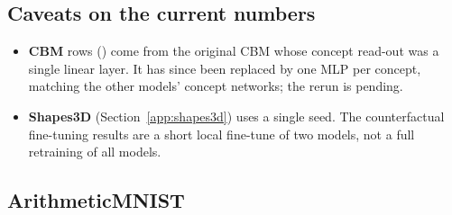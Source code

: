 \subsection{Caveats on the current numbers}
\label{app:caveats}
\begin{itemize}
  \item \textbf{CBM} rows (\ddag) come from the original CBM whose concept
        read-out was a single linear layer. It has since been replaced by one
        MLP per concept, matching the other models' concept networks; the
        rerun is pending. 
  \item \textbf{Shapes3D} (Section~\ref{app:shapes3d}) uses a single seed. The
        counterfactual fine-tuning results are a short local fine-tune of two
        models, not a full retraining of all models.
\end{itemize}

\subsection{ArithmeticMNIST}
\label{app:mnist}

